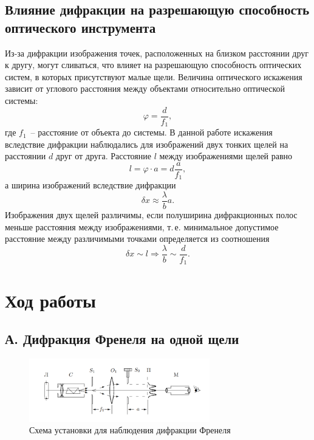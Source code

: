 \documentclass[a4paper,12pt]{article} %
\begin{document}
\subsection*{Влияние дифракции на разрешающую способность оптического инструмента}
Из-за дифракции изображения точек, расположенных на близком расстоянии друг к другу, могут сливаться, что влияет на разрешающую способность оптических систем, в которых присутствуют малые щели. Величина оптического искажения зависит от углового расстояния между объектами относительно оптической системы:
\begin{equation}
\varphi = \frac{d}{f_1},
\end{equation}
где $f_1$~-- расстояние от объекта до системы. В данной работе искажения вследствие дифракции наблюдались для изображений двух тонких щелей на расстоянии $d$ друг от друга. Расстояние $l$ между изображениями щелей равно 
\begin{equation}
l = \varphi \cdot a = d\frac{a}{f_1}, 
\end{equation}
а ширина изображений вследствие дифракции
\begin{equation}
    \delta x \approx \frac{\lambda}{b}a.
\end{equation}
Изображения двух щелей различимы, если полуширина дифракционных полос меньше расстояния между изображениями, т.\,е. минимальное допустимое расстояние между различимыми точками определяется из соотношения
\begin{equation}
\delta x \sim l \Rightarrow \frac{\lambda}{b} \sim \frac{d}{f_1}.
\end{equation}

\section{Ход работы}

\subsection*{А. Дифракция Френеля на одной щели}
\begin{figure}[h]
    \centering
    \includegraphics[width=0.7\textwidth]{frenelSetup.png}
    \caption{Схема установки для наблюдения дифракции Френеля}
    \label{fig:frenel}
\end{figure}
\end{document}
